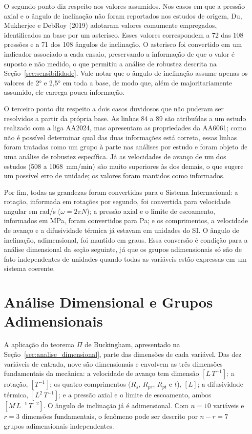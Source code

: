 \documentclass[12pt,openany]{report}
\begin{document}
O segundo ponto diz respeito aos valores assumidos. Nos casos em que a pressão axial e o ângulo de inclinação não foram reportados nos estudos de origem, Du, Mukherjee e DebRoy (2019) adotaram valores comumente empregados, identificados na base por um asterisco. Esses valores correspondem a 72 das 108 pressões e a 71 dos 108 ângulos de inclinação. O asterisco foi convertido em um indicador associado a cada ensaio, preservando a informação de que o valor é suposto e não medido, o que permitiu a análise de robustez descrita na Seção~\ref{sec:sensibilidade}. Vale notar que o ângulo de inclinação assume apenas os valores de 2° e 2,5° em toda a base, de modo que, além de majoritariamente assumido, ele carrega pouca informação.

O terceiro ponto diz respeito a dois casos duvidosos que não puderam ser resolvidos a partir da própria base. As linhas 84 a 89 são atribuídas a um estudo realizado com a liga AA2024, mas apresentam as propriedades da AA6061; como não é possível determinar qual das duas informações está correta, essas linhas foram tratadas como um grupo à parte nas análises por estudo e foram objeto de uma análise de robustez específica. Já as velocidades de avanço de um dos estudos (508 a 1068~mm/min) são muito superiores às dos demais, o que sugere um possível erro de unidade; os valores foram mantidos como informados.

Por fim, todas as grandezas foram convertidas para o Sistema Internacional: a rotação, informada em rotações por segundo, foi convertida para velocidade angular em rad/s ($\omega = 2\pi N$); a pressão axial e o limite de escoamento, informados em MPa, foram convertidos para Pa; e os comprimentos, a velocidade de avanço e a difusividade térmica já estavam em unidades do SI. O ângulo de inclinação, adimensional, foi mantido em graus. Essa conversão é condição para a análise dimensional da seção seguinte, já que os grupos adimensionais só são de fato independentes de unidades quando todas as variáveis estão expressas em um sistema coerente.

\section{Análise Dimensional e Grupos Adimensionais}
\label{sec:grupos}

A aplicação do teorema $\Pi$ de Buckingham, apresentado na Seção~\ref{sec:analise_dimensional}, parte das dimensões de cada variável. Das dez variáveis de entrada, nove são dimensionais e envolvem as três dimensões fundamentais da mecânica: a velocidade de avanço tem dimensão $[L\,T^{-1}]$; a rotação, $[T^{-1}]$; os quatro comprimentos ($R_s$, $R_{pr}$, $R_{pt}$ e $t$), $[L]$; a difusividade térmica, $[L^{2}\,T^{-1}]$; e a pressão axial e o limite de escoamento, ambos $[M\,L^{-1}\,T^{-2}]$. O ângulo de inclinação já é adimensional. Com $n = 10$ variáveis e $r = 3$ dimensões fundamentais, o fenômeno pode ser descrito por $n - r = 7$ grupos adimensionais independentes.
\end{document}
